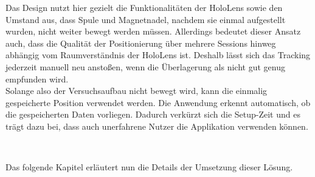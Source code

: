 Das Design nutzt hier gezielt die Funktionalitäten der HoloLens sowie den Umstand aus, dass Spule und Magnetnadel, nachdem sie einmal aufgestellt wurden, nicht weiter bewegt werden müssen. Allerdings bedeutet dieser Ansatz auch, dass die Qualität der Positionierung über mehrere Sessions hinweg abhängig vom Raumverständnis der HoloLens ist. Deshalb lässt sich das Tracking jederzeit manuell neu anstoßen, wenn die Überlagerung als nicht gut genug empfunden wird.\\

Solange also der Versuchsaufbau nicht bewegt wird, kann die einmalig gespeicherte Position verwendet werden. Die Anwendung erkennt automatisch, ob die gespeicherten Daten vorliegen. Dadurch verkürzt sich die Setup-Zeit und es trägt dazu bei, dass auch unerfahrene Nutzer die Applikation verwenden können.

\vspace{8px}
\begin{center}
	\\
\end{center}
\vspace{6px}

Das folgende Kapitel erläutert nun die Details der Umsetzung dieser Lösung.

